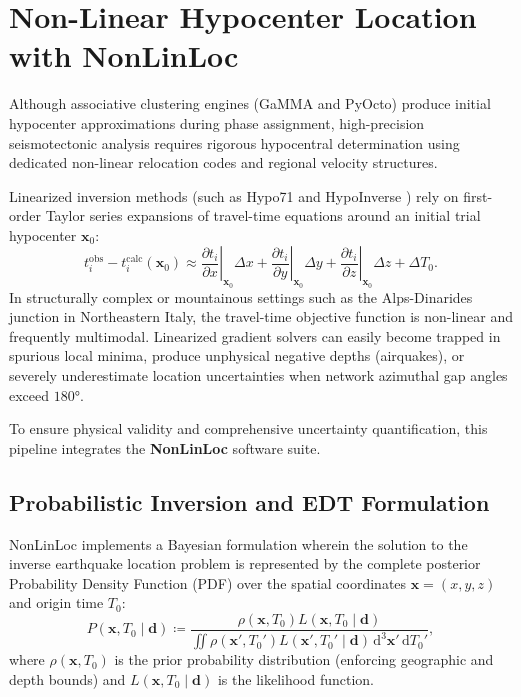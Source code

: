 \section{Non-Linear Hypocenter Location with \acs{NonLinLoc}}
\label{sec:hypocenter_location}

Although associative clustering engines (\ac{GaMMA} and \ac{PyOcto}) produce
initial hypocenter approximations during phase assignment,
high-precision seismotectonic analysis requires rigorous hypocentral
determination using dedicated non-linear relocation codes and
regional velocity structures.

Linearized inversion methods (such as Hypo71 \parencite{Hypo71} and
HypoInverse \parencite{HypoInverse}) rely on first-order Taylor series
expansions of travel-time equations around an initial trial
hypocenter $\mathbf{x}_0$:
\begin{equation}
  t_i^{\mathrm{obs}} - t_i^{\mathrm{calc}}(\mathbf{x}_0) \approx
  \left. \frac{\partial t_i}{\partial x} \right|_{\mathbf{x}_0}
  \Delta x + \left. \frac{\partial t_i}{\partial y}
  \right|_{\mathbf{x}_0} \Delta y + \left. \frac{\partial
  t_i}{\partial z} \right|_{\mathbf{x}_0} \Delta z + \Delta T_0.
\end{equation}
In structurally complex or mountainous settings such as the
Alps-Dinarides junction in Northeastern Italy, the travel-time
objective function is non-linear and frequently multimodal.
Linearized gradient solvers can easily become trapped in spurious
local minima, produce unphysical negative depths (airquakes), or
severely underestimate location uncertainties when network azimuthal
gap angles exceed $\ang{180}$.

To ensure physical validity and comprehensive uncertainty
quantification, this pipeline integrates the \textbf{\ac{NonLinLoc}}
software suite.

\subsection{Probabilistic Inversion and \acs{EDT} Formulation}
\ac{NonLinLoc} implements a Bayesian formulation wherein the solution to
the inverse earthquake location problem is represented by the
complete posterior Probability Density Function (PDF) over the
spatial coordinates $\mathbf{x} = (x, y, z)$ and origin time $T_0$:
\begin{equation}
  P(\mathbf{x}, T_0 \mid \mathbf{d}) \coloneqq \frac{\rho(\mathbf{x}, T_0)
  L(\mathbf{x}, T_0 \mid \mathbf{d})}{\iint \rho(\mathbf{x}',
    T_0') L(\mathbf{x}', T_0' \mid \mathbf{d})
  \,\mathrm{d}^3\mathbf{x}' \,\mathrm{d}T_0'},
\end{equation}
where $\rho(\mathbf{x}, T_0)$ is the prior probability distribution
(enforcing geographic and depth bounds) and $L(\mathbf{x}, T_0 \mid
\mathbf{d})$ is the likelihood function.


